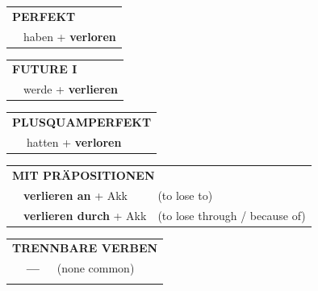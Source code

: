 \documentclass[10pt,a4paper]{revtex4-2}
\begin{document}
\begin{verbbox}
 \begin{tabular}{rl}
     \multicolumn{2}{l}{\textbf{PERFEKT}}\\
   & haben + \textbf{verloren}\\
  \end{tabular}
\hfill
   \begin{tabular}{rl}
    \multicolumn{2}{l}{\textbf{FUTURE I} }\\
   & werde + \textbf{verlieren}\\
  \end{tabular}
\hfill
   \begin{tabular}{rl}
      \multicolumn{2}{l}{\textbf{PLUSQUAMPERFEKT}}\\
   & hatten + \textbf{verloren}\\
  \end{tabular}

   \vspace{10pt}

   \begin{tabular}{lll}
      \multicolumn{3}{l}{\textbf{MIT PRÄPOSITIONEN}}\\
& \textbf{verlieren an} + Akk & (to lose to)\\
& \textbf{verlieren durch} + Akk & (to lose through / because of)\\
\end{tabular}
  \hfill
   \begin{tabular}{lll}
      \multicolumn{3}{l}{\textbf{TRENNBARE VERBEN}}\\
 & \textbf{---} & (none common)\\
\vspace{10pt}
  \end{tabular}

  \vspace{-5pt}

\end{verbbox}
\end{document}

